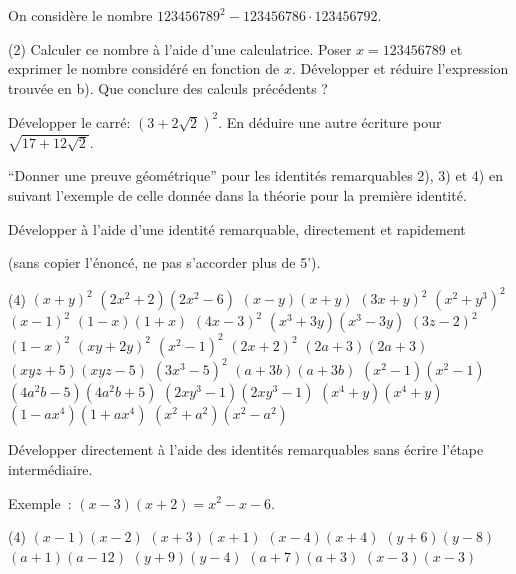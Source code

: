 \documentclass[a4paper,12pt]{report}
\begin{document}
\begin{acti}
On considère le nombre $123456789^2-123456786 \cdot 123456792$.
\begin{tasks}(2)
\task Calculer ce nombre à l'aide d'une calculatrice.
\task Poser $x=123456789$ et exprimer le nombre considéré en fonction de $x$.
\task Développer et réduire l'expression trouvée en b).
\task Que conclure des calculs précédents ?
\end{tasks}	
\end{acti}
\begin{acti}
Développer le carré: $(3+2 \sqrt{2})^2$. En déduire une autre écriture pour $\sqrt{17+12 \sqrt{2}}$.
\end{acti}
\begin{exo}
\enquote{Donner une preuve géométrique} pour les identités remarquables 2), 3) et 4) en suivant l'exemple de celle donnée dans la théorie pour la première identité.
\end{exo}
\begin{exo}
Développer à l'aide d'une identité remarquable, directement et rapidement 

(sans copier l'énoncé, ne pas s'accorder plus de 5').
	\begin{tasks}(4)
\task $(x+y)^2$
\task $(2x^2+2)(2x^2-6)$
\task $(x-y)(x+y)$
\task $(3 x+y)^2$
\task $\left(x^2+y^3\right)^2$
\task $(x-1)^2$
\task $(1-x)(1+x)$
\task $(4 x-3)^2$
\task $\left(x^3+3 y\right)\left(x^3-3 y\right)$
\task $(3 z-2)^2$
\task $(1-x)^2$
\task $(x y+2 y)^2$
\task $\left(x^2-1\right)^2$
\task $(2 x+2)^2$
\task $(2 a+3)(2 a+3)$
\task $(x y z+5)(x y z-5)$
\task $\left(3 x^3-5\right)^2$
\task $(a+3 b)(a+3 b)$
\task $\left(x^2-1\right)\left(x^2-1\right)$
\task $\left(4 a^2 b-5\right)\left(4 a^2 b+5\right)$
\task $\left(2 x y^3-1\right)\left(2 x y^3-1\right)$
\task $\left(x^4+y\right)\left(x^4+y\right)$
\task $\left(1-a x^4\right)\left(1+a x^4\right)$
\task $\left(x^2+a^2\right)\left(x^2-a^2\right)$
	\end{tasks}
\end{exo}
\begin{exo}
Développer directement à l'aide des identités remarquables sans écrire l'étape intermédiaire.

Exemple~: $(x-3)(x+2)=x^2-x-6$.
	\begin{tasks}(4)
\task $(x-1)(x-2)$
\task $(x+3)(x+1)$
\task $(x-4)(x+4)$
\task $(y+6)(y-8)$
\task $(a+1)(a-12)$
\task $(y+9)(y-4)$
\task $(a+7)(a+3)$
\task $(x-3)(x-3)$
	\end{tasks}
\end{exo}
\end{document}
